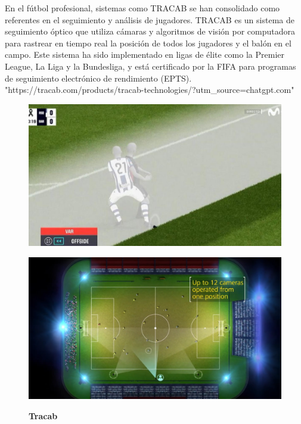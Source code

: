 \documentclass[12pt, a4paper, twoside]{article}
\begin{document}
	En el fútbol profesional, sistemas como TRACAB se han consolidado como referentes en el seguimiento y análisis de jugadores. TRACAB es un sistema de seguimiento óptico que utiliza cámaras y algoritmos de visión por computadora para rastrear en tiempo real la posición de todos los jugadores y el balón en el campo. Este sistema ha sido implementado en ligas de élite como la Premier League, La Liga y la Bundesliga, y está certificado por la FIFA para programas de seguimiento electrónico de rendimiento (EPTS). "https://tracab.com/products/tracab-technologies/?utm\_source=chatgpt.com"
	
	\begin{figure}[H]
		\centering
		\begin{minipage}{0.45\textwidth} %
			\centering
			\includegraphics[width=\textwidth]{image/tracab}
			\label{tracab}
		\end{minipage}
		\hfill
		\begin{minipage}{0.45\textwidth} %
			\centering
			\includegraphics[width=\textwidth]{image/tracab2}
			\label{tracab2}
		\end{minipage}
		\caption{\textbf{Tracab}}
	\end{figure}
	
\end{document}
